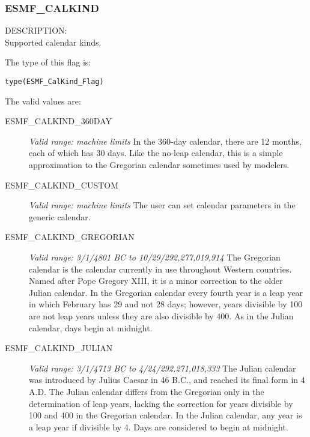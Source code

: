 
\label{subsec:Calendar_options}

\subsubsection{ESMF\_CALKIND}
\label{opt:calkindflag}

{\sf DESCRIPTION:\\}
Supported calendar kinds.

The type of this flag is:

{\tt type(ESMF\_CalKind\_Flag)}

The valid values are:
\begin{description}
      
\item [ESMF\_CALKIND\_360DAY] 
{\it Valid range: machine limits} 
\newline In the 360-day calendar, there are 12 months, each of which has 30 days.  
Like the no-leap calendar, this is a simple approximation to the Gregorian
calendar sometimes used by modelers.

\item [ESMF\_CALKIND\_CUSTOM] 
{\it Valid range: machine limits} 
\newline The user can set calendar parameters in the generic calendar.

\item [ESMF\_CALKIND\_GREGORIAN] 
{\it Valid range: 3/1/4801 BC to 10/29/292,277,019,914 }
\newline The Gregorian calendar is the calendar currently in use 
throughout Western countries.  Named after Pope Gregory XIII, it is a minor 
correction to the older Julian calendar. In the Gregorian calendar every
fourth year is a leap year in which February has 29 and not 28 days;
however, years divisible by 100 are not leap years unless they are also 
divisible  by 400.  As in the Julian calendar, days begin at midnight.

\item [ESMF\_CALKIND\_JULIAN]
{\it Valid range: 3/1/4713 BC to 4/24/292,271,018,333 } 
\newline The Julian calendar was introduced by Julius Caesar in 46 B.C., and 
reached its final form in 4 A.D.  The Julian calendar differs from the 
Gregorian only in the determination of leap years, lacking the correction 
for years divisible by 100 and 400 in the Gregorian calendar.  In the Julian 
calendar, any year is a leap year if divisible by 4.  Days are considered to 
begin at midnight.


\end{description}
